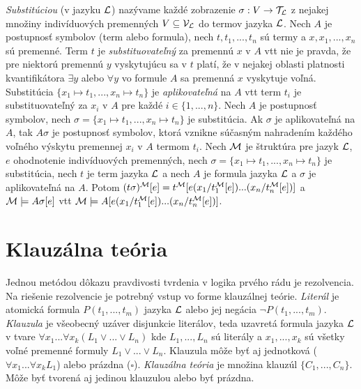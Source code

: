 \emph{Substitúciou} (v jazyku $\mathcal{L}$) nazývame každé zobrazenie $\sigma: V \to \mathcal{T}_{\mathcal{L}}$ z nejakej množiny indivíduových premenných $V \subseteq \mathcal{V}_{\mathcal{L}}$ do termov jazyka $\mathcal{L}$.
Nech $A$ je postupnosť symbolov (term alebo formula), nech $t, t_1, ..., t_n$ sú termy a $x, x_1, ..., x_n$ sú premenné.
Term $t$ je \emph{substituovateľný} za premennú $x$ v $A$ vtt nie je pravda, že pre niektorú premennú $y$ vyskytujúcu sa v $t$ platí, že v nejakej oblasti platnosti kvantifikátora $\exists y$ alebo $\forall y$ vo formule $A$ sa premenná $x$ vyskytuje voľná.
Substitúcia $\{x_1 \mapsto t_1, ..., x_n \mapsto t_n\}$ je \emph{aplikovateľná} na $A$ vtt term $t_i$ je substituovateľný za $x_i$ v $A$ pre každé $i \in \{1, ..., n\}$.
Nech $A$ je postupnosť symbolov, nech $\sigma = \{x_1 \mapsto t_1, ..., x_n \mapsto t_n\}$ je substitúcia. Ak $\sigma$ je aplikovateľná na $A$, tak $A\sigma$ je postupnosť symbolov, ktorá vznikne súčasným nahradením každého voľného výskytu premennej $x_i$ v $A$ termom $t_i$.
Nech $\mathcal{M}$ je štruktúra pre jazyk $\mathcal{L}$, $e$ ohodnotenie indivíduových premenných, nech $\sigma = \{x_1 \mapsto t_1, ..., x_n \mapsto t_n\}$ je substitúcia, nech $t$ je term jazyka $\mathcal{L}$ a nech $A$ je formula jazyka $\mathcal{L}$ a $\sigma$ je aplikovateľná na $A$.
Potom $(t\sigma)^{\mathcal{M}} [e] = t^{\mathcal{M}} [e(x_1/t^{\mathcal{M}}_1 [e]) ... (x_n/t^{\mathcal{M}}_n [e])]$ a $\mathcal{M} \models A\sigma[e]$ vtt $\mathcal{M} \models A[e(x_1/t^{\mathcal{M}}_1 [e]) ... (x_n/t^{\mathcal{M}}_n [e])]$.


\section{Klauzálna teória}

Jednou metódou dôkazu pravdivosti tvrdenia v logika prvého rádu je rezolvencia. Na riešenie rezolvencie je potrebný vstup vo forme klauzálnej teórie.
\emph{Literál} je atomická formula $P(t_1, ..., t_m)$ jazyka $\mathcal{L}$ alebo jej negácia $\neg P(t_1, ..., t_m)$. 
\emph{Klauzula} je všeobecný uzáver disjunkcie literálov, teda uzavretá formula jazyka $\mathcal{L}$ v tvare $\forall x_1 ... \forall x_k (L_1 \lor ... \lor L_n)$ kde $L_1, ..., L_n$ sú literály a $x_1, ..., x_k$ sú všetky voľné premenné formuly $L_1 \lor ... \lor L_n$. Klauzula môže byť aj jednotková ($\forall x_1 ... \forall x_k L_1$) alebo prázdna ($\square$).
\emph{Klauzálna teória} je množina klauzúl $\{C_1, ..., C_n\}$. Môže byť tvorená aj jedinou klauzulou alebo byť prázdna.

